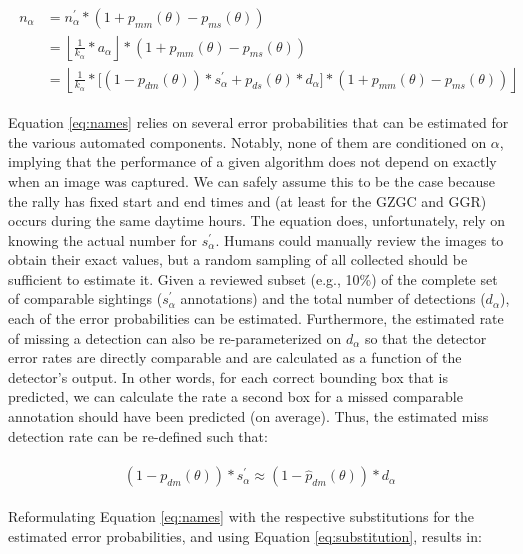 \begin{align}
    \label{eq:names}
    \begin{split}
        n_{\alpha} &= n^{\prime}_{\alpha} * (1 + p_{mm}(\theta) - p_{ms}(\theta)) \\
        &= \left\lfloor \frac{1}{k_{\alpha}} * a_{\alpha} \right\rfloor * (1 + p_{mm}(\theta) - p_{ms}(\theta)) \\
        &= \left\lfloor \frac{1}{k_{\alpha}} * \lbrack (1 - p_{dm}(\theta))*s^{\prime}_{\alpha} + p_{ds}(\theta)*d_{\alpha} \rbrack * (1 + p_{mm}(\theta) - p_{ms}(\theta)) \right\rfloor
    \end{split}
\end{align}

\noindent Equation \eqref{eq:names} relies on several error probabilities that can be estimated for the various automated components. Notably, none of them are conditioned on $\alpha$, implying that the performance of a given algorithm does not depend on exactly when an image was captured.  We can safely assume this to be the case because the rally has fixed start and end times and (at least for the GZGC and GGR) occurs during the same daytime hours.  The equation does, unfortunately, rely on knowing the actual number for $s^{\prime}_{\alpha}$.  Humans could manually review the images to obtain their exact values, but a random sampling of all collected should be sufficient to estimate it.  Given a reviewed subset (e.g., 10\%) of the complete set of comparable sightings ($s^{\prime}_{\alpha}$ annotations) and the total number of detections ($d_{\alpha}$), each of the error probabilities can be estimated.  Furthermore, the estimated rate of missing a detection can also be re-parameterized on $d_{\alpha}$ so that the detector error rates are directly comparable and are calculated as a function of the detector's output.  In other words, for each correct bounding box that is predicted, we can calculate the rate a second box for a missed comparable annotation should have been predicted (on average). Thus, the estimated miss detection rate can be re-defined such that:

\begin{align} \label{eq:substitution}
    \begin{split}
        (1 - p_{dm}(\theta))*s^{\prime}_{\alpha} \approx (1 - \hat{p}_{dm}(\theta))*d_{\alpha}
    \end{split}
\end{align}

\noindent Reformulating Equation \eqref{eq:names} with the respective substitutions for the estimated error probabilities, and using Equation \eqref{eq:substitution}, results in:

